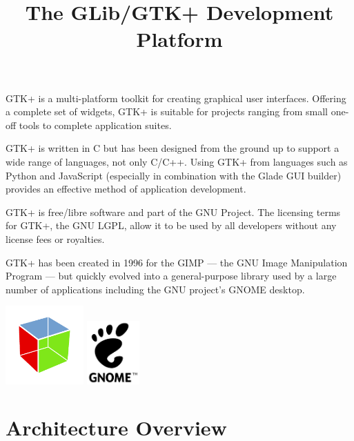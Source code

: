 \documentclass[a4paper,notumble]{leaflet}
\title{The GLib/GTK+ Development Platform}
\date{}
\author{}
\begin{document}
\maketitle
\thispagestyle{empty}

GTK+ is a multi-platform toolkit for creating graphical user interfaces. Offering a complete set of widgets, GTK+ is suitable for projects ranging from small one-off tools to complete application suites.

GTK+ is written in C but has been designed from the ground up to support a wide range of languages, not only C/C++. Using GTK+ from languages such as Python and JavaScript (especially in combination with the Glade GUI builder) provides an effective method of application development.

GTK+ is free/libre software and part of the GNU Project. The licensing terms for GTK+, the GNU LGPL, allow it to be used by all developers without any license fees or royalties.

GTK+ has been created in 1996 for the GIMP --- the GNU Image Manipulation Program --- but quickly evolved into a general-purpose library used by a large number of applications including the GNU project's GNOME desktop.

\begin{center}
  \includegraphics[width=3cm]{images/gtk-logo.pdf}
  \hspace{1cm}
  \includegraphics[width=2cm]{images/gnome-logo.pdf}
\end{center}

\pagebreak

\section{Architecture Overview}
\end{document}
